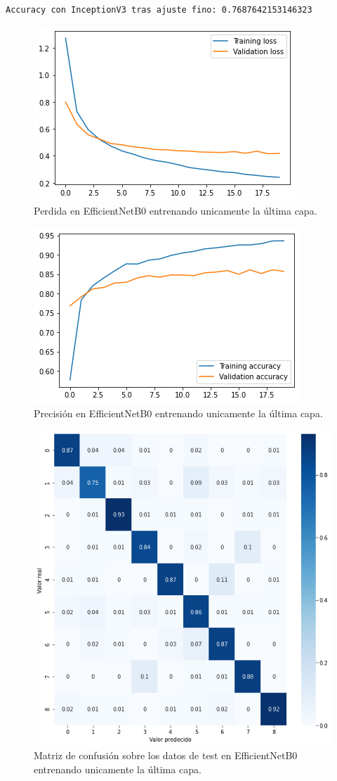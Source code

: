 \begin{lstlisting}
Accuracy con InceptionV3 tras ajuste fino: 0.7687642153146323
\end{lstlisting}




\begin{figure}[H]
  \centering
  \includegraphics[width=0.5\linewidth]{Imagenes/entrenamiento_redes/ult/efficientnet_ult_loss.png}
  \caption{Perdida en EfficientNetB0 entrenando unicamente la última capa.}
\end{figure}

\begin{figure}[H]
  \centering
  \includegraphics[width=0.5\linewidth]{Imagenes/entrenamiento_redes/ult/efficientnet_ult_acc.png}
  \caption{Precisión en EfficientNetB0 entrenando unicamente la última capa.}
\end{figure}

\begin{figure}[H]
  \centering
  \includegraphics[width=0.5\linewidth]{Imagenes/entrenamiento_redes/ult/efficientnet_ult_matriz.png}
  \caption{Matriz de confusión sobre los datos de test en EfficientNetB0 entrenando unicamente la última capa.}
\end{figure}


